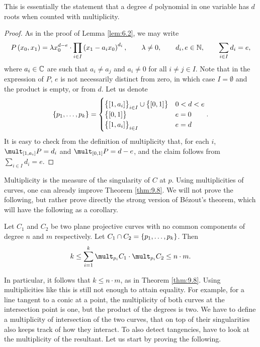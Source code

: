 \pagebreak

This is essentially the statement that a degree $ d $ polynomial in one variable has $ d $ roots when counted with multiplicity.

\begin{proof}
As in the proof of Lemma \ref{lem:6.2}, we may write
$$ P\br{x_0, x_1} = \lambda x_0^{d - e} \cdot \prod_{i \in I} \br{x_1 - a_ix_0}^{d_i}, \qquad \lambda \ne 0, \qquad d_i, e \in \NN, \qquad \sum_{i \in I} d_i = e, $$
where $ a_i \in \mathbb{C} $ are such that $ a_i \ne a_j $ and $ a_i \ne 0 $ for all $ i \ne j \in I $. Note that in the expression of $ P $, $ e $ is not necessarily distinct from zero, in which case $ I = \emptyset $ and the product is empty, or from $ d $. Let us denote
$$ \cbr{p_1, \dots, p_k} =
\begin{cases}
\cbr{\sbr{1, a_i}}_{i \in I} \cup \cbr{\sbr{0, 1}} & 0 < d < e \\
\cbr{\sbr{0, 1}} & e = 0 \\
\cbr{\sbr{1, a_i}}_{i \in I} & e = d
\end{cases}.
$$
It is easy to check from the definition of multiplicity that, for each $ i $, $ \mult_{\sbr{1, a_i}} P = d_i $ and $ \mult_{\sbr{0, 1}} P = d - e $, and the claim follows from $ \sum_{i \in I} d_i = e $.
\end{proof}


Multiplicity is the measure of the singularity of $ C $ at $ p $. Using multiplicities of curves, one can already improve Theorem \ref{thm:9.8}. We will not prove the following, but rather prove directly the strong version of B\'ezout's theorem, which will have the following as a corollary.

\begin{theorem}
\label{thm:11.6}
Let $ C_1 $ and $ C_2 $ be two plane projective curves with no common components of degree $ n $ and $ m $ respectively. Let $ C_1 \cap C_2 = \cbr{p_1, \dots, p_k} $. Then
$$ k \le \sum_{i = 1}^k \mult_{p_i} C_1 \cdot \mult_{p_i} C_2 \le n \cdot m. $$
\end{theorem}

In particular, it follows that $ k \le n \cdot m $, as in Theorem \ref{thm:9.8}. Using multiplicities like this is still not enough to attain equality. For example, for a line tangent to a conic at a point, the multiplicity of both curves at the intersection point is one, but the product of the degrees is two. We have to define a multiplicity of intersection of the two curves, that on top of their singularities also keeps track of how they interact. To also detect tangencies, have to look at the multiplicity of the resultant. Let us start by proving the following.

